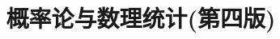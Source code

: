 \documentclass[a4paper]{article}
\theoremstyle{mystyle}
\begin{document}
	\title{\huge \heiti 概率论与数理统计(第四版)}
	\maketitle
	\setcounter{section}{1}
	
	
\end{document}
